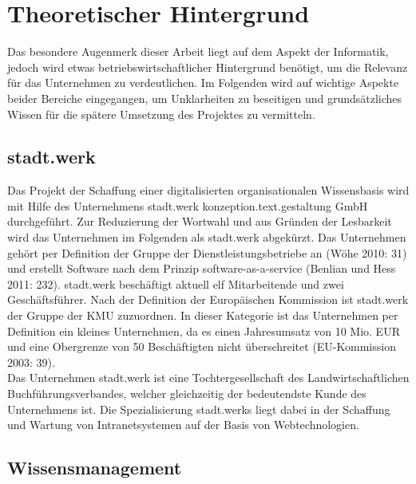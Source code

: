 \documentclass[a4paper]{scrartcl}
\begin{document}
\newpage

\section{Theoretischer Hintergrund}
Das besondere Augenmerk dieser Arbeit liegt auf dem Aspekt der Informatik, jedoch wird etwas betriebswirtschaftlicher Hintergrund benötigt, um die Relevanz für das Unternehmen zu verdeutlichen. Im Folgenden wird auf wichtige Aspekte beider Bereiche eingegangen, um Unklarheiten zu beseitigen und grundsätzliches Wissen für die spätere Umsetzung des Projektes zu vermitteln.

\subsection{stadt.werk}
Das Projekt der Schaffung einer digitalisierten organisationalen Wissensbasis wird mit Hilfe des Unternehmens stadt.werk konzeption.text.gestaltung GmbH durchgeführt. Zur Reduzierung der Wortwahl und aus Gründen der Lesbarkeit wird das Unternehmen im Folgenden als stadt.werk abgekürzt. Das Unternehmen gehört per Definition der Gruppe der Dienstleistungsbetriebe an (Wöhe 2010: 31) und erstellt Software nach dem Prinzip software-as-a-service (Benlian und Hess 2011: 232). stadt.werk beschäftigt aktuell elf Mitarbeitende und zwei Geschäftsführer. Nach der Definition der Europäischen Kommission ist stadt.werk der Gruppe der KMU zuzuordnen. In dieser Kategorie ist das Unternehmen per Definition ein kleines Unternehmen, da es einen Jahresumsatz von 10 Mio. EUR und eine Obergrenze von 50 Beschäftigten nicht überschreitet (EU-Kommission 2003: 39). \\
Das Unternehmen stadt.werk ist eine Tochtergesellschaft des Landwirtschaftlichen Buchführungsverbandes, welcher gleichzeitig der bedeutendste Kunde des Unternehmens ist. Die Spezialisierung stadt.werks liegt dabei in der Schaffung und Wartung von Intranetsystemen auf der Basis von Webtechnologien.

\subsection{Wissensmanagement}
\end{document}
